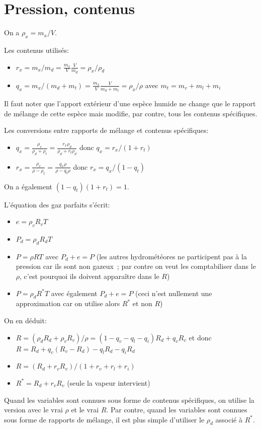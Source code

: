 \documentclass{article}
\begin{document}
\section{Pression, contenus}
\label{pression_contenus}
On a $\rho_x=m_x/V$.

Les contenus utilisés:
\begin{itemize}
 \item $r_x=m_x/m_d=\frac{m_x}{V}\frac{V}{m_d}=\rho_x/\rho_d$
 \item $q_x=m_x/(m_d+m_t)=\frac{m_x}{V}\frac{V}{m_d+m_t}=\rho_x/\rho$ avec $m_t=m_v+m_l+m_i$
\end{itemize}
Il faut noter que l'apport extérieur d'une espèce humide ne change que le rapport de mélange de cette espèce mais modifie, par contre, tous les contenus spécifiques.

Les conversions entre rapports de mélange et contenus spécifiques:
\begin{itemize}
 \item $q_x=\frac{\rho_x}{\rho_d+\rho_t}=\frac{r_x \rho_d}{\rho_d + r_t \rho_d}$ donc {\color{red} $q_x=r_x/(1+r_t)$}
 \item $r_x=\frac{\rho_x}{\rho-\rho_t}=\frac{q_x \rho}{\rho-q_t \rho}$ donc {\color{red} $r_x=q_x/(1-q_t)$}
\end{itemize}
On a également $(1-q_t)(1+r_t)=1$.

L'équation des gaz parfaits s'écrit:
\begin{itemize}
 \item $e=\rho_v R_v T$
 \item $P_d=\rho_d R_d T$
 \item $P=\rho R T$ avec $P_d+e=P$ (les autres hydrométéores ne participent pas à la pression car ils sont non gazeux~; par contre on veut les comptabiliser dans le $\rho$, c'est pourquoi ils doivent apparaître dans le $R$)
 \item {\color{red}$P=\rho_d R^* T$} avec également $P_d+e=P$ (ceci n'est nullement une approximation car on utilise alors $R^*$ et non $R$)
\end{itemize}
On en déduit:
\begin{itemize}
 \item $R=(\rho_d R_d + \rho_v R_v)/\rho=(1-q_v-q_l-q_i)R_d+q_v R_v$ et donc {\color{red}$R=R_d+q_v(R_v-R_d)-q_l R_d -q_i R_d$}
 \item $R=(R_d +r_v R_v)/(1+r_v+r_l+r_i)$
 \item {\color{red}$R^*=R_d + r_v R_v$} (seule la vapeur intervient)
\end{itemize}
Quand les variables sont connues sous forme de contenus spécifiques, on utilise la version avec le vrai $\rho$ et le vrai $R$.
Par contre, quand les variables sont connues sous forme de rapports de mélange, il est plus simple d'utiliser le $\rho_d$ associé à $R^*$.
\end{document}
